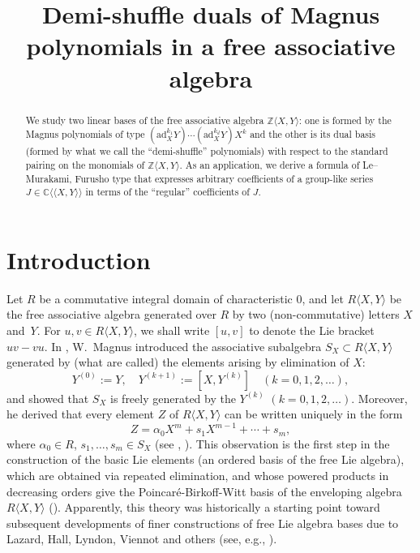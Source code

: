 \documentclass[ALCO,Unicode,published]{cedram}
\title
[Demi-shuffle duals of Magnus polynomials]
{Demi-shuffle duals of Magnus polynomials
in a free associative algebra}
\author[\initial{H.} Nakamura]{\firstname{Hiroaki} \lastname{Nakamura}}
\def\la{\langle}
\def\ra{\rangle}
\begin{document}
\begin{abstract}
We study two linear bases of the free associative algebra
$\mathbb{Z}\langle X,Y\rangle$: one is formed by the Magnus polynomials of type
$(\mathrm{ad}_X^{k_1}Y)\cdots(\mathrm{ad}_X^{k_d}Y) X^k$ 
and the other is its dual basis (formed by what we call the ``demi-shuffle'' polynomials)
with respect to the standard pairing on the monomials of 
$\mathbb{Z}\langle X,Y\rangle$.
As an application, we derive a formula of Le--Murakami, Furusho type 
that expresses arbitrary coefficients of a group-like series 
$J\in \mathbb{C}\langle\!\langle X,Y\rangle\!\rangle$
in terms of the ``regular'' coefficients of $J$.  
\end{abstract}


\maketitle

 \theoremstyle{remark}
  \newtheorem{Note}[cdrthm]{Note}


\section{Introduction}

Let $R$ be a commutative integral domain of characteristic 0, and let $R\la X,Y\ra$ be
the free associative algebra generated over $R$ by two (non-commutative) 
letters $X$ and~$Y$.
For $u,v\in R\la X,Y\ra$, we shall write $[u,v]$
to denote the Lie bracket $uv-vu$.
In \cite{M37}, W.~Magnus introduced the associative subalgebra 
$S_X\subset R\la X,Y\ra$ generated by 
(what are called) the elements arising by elimination of $X$:
\begin{equation}
Y^{(0)}:=Y, \quad
Y^{(k+1)}:=[X,Y^{(k)}] \quad
(k=0,1,2,\dots),
\end{equation}
and showed that $S_X$ is freely generated by the $Y^{(k)}$
$(k=0,1,2,\dots)$.
Moreover, he derived that every element $Z$ of  $R\la X,Y\ra$ can be
written uniquely in the form
\begin{equation} \label{1st-elimination}
Z=\alpha_0 X^m +s_1 X^{m-1}+\cdots+s_m,
\end{equation}
where $\alpha_0\in R$, $s_1,\dots, s_m\in S_X$
(see \cite[Hilfssatz 2]{M37}, \cite[Lemma 5.6]{MKS}).
This observation is the first step in the construction 
of the basic Lie elements (an ordered basis of the free Lie algebra), 
which are obtained via repeated elimination, and
whose powered products in decreasing orders give 
the Poincar\'e-Birkoff-Witt
basis of the enveloping algebra~$R\la X,Y\ra$ (\cite[Theorem~5.8]{MKS}).
Apparently, this theory was historically a starting point 
toward subsequent developments of
finer constructions of free Lie algebra bases 
due to Lazard, Hall, Lyndon, Viennot and others
(see, e.g., \cite[Notes 4.5, 5.7]{Reu}). 
\end{document}
